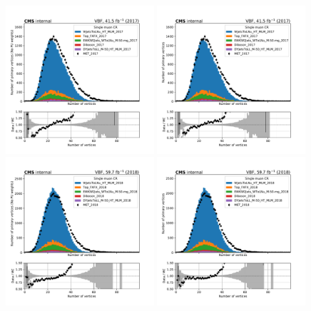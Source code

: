 \begin{figure}[ht!]
  \begin{center}
    \includegraphics[width=0.49\textwidth]{Pileup/cr_1m_vbf_npv_nopu_2017.pdf}
    \includegraphics[width=0.49\textwidth]{Pileup/cr_1m_vbf_npv_2017.pdf}
    \includegraphics[width=0.49\textwidth]{Pileup/cr_1m_vbf_npv_nopu_2018.pdf}
    \includegraphics[width=0.49\textwidth]{Pileup/cr_1m_vbf_npv_2018.pdf}

\end{center}
\end{figure}
